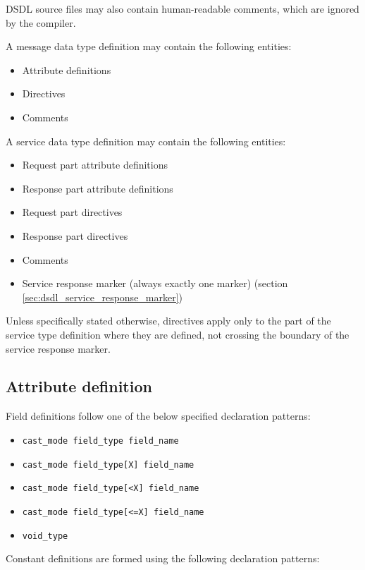 DSDL source files may also contain human-readable comments, which are ignored by the compiler.

A message data type definition may contain the following entities:

\begin{itemize}
    \item Attribute definitions
    \item Directives
    \item Comments
\end{itemize}

A service data type definition may contain the following entities:

\begin{itemize}
    \item Request part attribute definitions
    \item Response part attribute definitions
    \item Request part directives
    \item Response part directives
    \item Comments
    \item Service response marker (always exactly one marker) (section \ref{sec:dsdl_service_response_marker})
\end{itemize}

Unless specifically stated otherwise,
directives apply only to the part of the service type definition where they are defined,
not crossing the boundary of the service response marker.

\subsection{Attribute definition}

Field definitions follow one of the below specified declaration patterns:

\begin{itemize}
    \item \verb|cast_mode field_type field_name|
    \item \verb|cast_mode field_type[X] field_name|
    \item \verb|cast_mode field_type[<X] field_name|
    \item \verb|cast_mode field_type[<=X] field_name|
    \item \verb|void_type|
\end{itemize}

Constant definitions are formed using the following declaration patterns:

